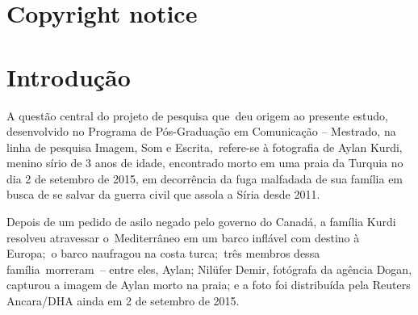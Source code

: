 \documentclass[
  letterpaper,
  a4paper,
  12pt]{scrbook}
\renewcommand*\contentsname{Índice}
\newcommand\contentsname{Índice}
\begin{document}
\ifdefined\Shaded\renewenvironment{Shaded}{\begin{tcolorbox}[breakable, frame hidden, boxrule=0pt, borderline west={3pt}{0pt}{shadecolor}, enhanced, interior hidden, sharp corners]}{\end{tcolorbox}}\fi

\renewcommand*\contentsname{Sumário}
{
\setcounter{tocdepth}{2}
\tableofcontents
}
\listoffigures
\listoftables
\mainmatter
{}

\hypertarget{copyright-notice}{%
\chapter*{Copyright notice}\label{copyright-notice}}



\hypertarget{introduuxe7uxe3o}{%
\chapter{Introdução}\label{introduuxe7uxe3o}}

A questão central do projeto de pesquisa que~deu origem ao presente
estudo, desenvolvido no Programa de Pós-Graduação em Comunicação --
Mestrado, na linha de pesquisa Imagem, Som e Escrita,~refere-se à
fotografia de Aylan Kurdi, menino sírio de 3 anos de idade, encontrado
morto em uma praia da Turquia no dia 2 de setembro de 2015, em
decorrência da fuga malfadada de sua família em busca de se salvar da
guerra civil que assola a Síria desde 2011.~

Depois de um pedido de asilo negado pelo governo do Canadá, a família
Kurdi resolveu atravessar o~Mediterrâneo em um barco inflável com
destino à Europa;~o barco naufragou na costa turca;~três membros dessa
família~morreram~-- entre eles, Aylan; Nilüfer Demir, fotógrafa da
agência Dogan, capturou a imagem de Aylan morto na praia; e a foto foi
distribuída pela Reuters Ancara/DHA ainda em 2 de setembro de 2015.
\end{document}
